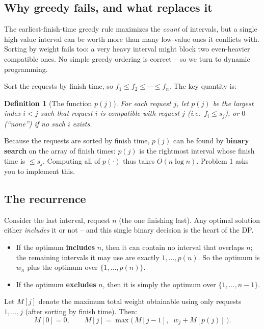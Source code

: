 \documentclass[11pt]{article}
\newtheorem{definition}[theorem]{Definition}
\begin{document}
\subsection{Why greedy fails, and what replaces it}

The earliest-finish-time greedy rule maximizes the \emph{count} of intervals, but a single
high-value interval can be worth more than many low-value ones it conflicts with. Sorting
by weight fails too: a very heavy interval might block two even-heavier compatible ones. No
simple greedy ordering is correct -- so we turn to dynamic programming.

Sort the requests by finish time, so $f_1 \le f_2 \le \cdots \le f_n$. The key quantity is:

\begin{definition}[The function $p(j)$]
For each request $j$, let $p(j)$ be the largest index $i < j$ such that request $i$ is
compatible with request $j$ (i.e.\ $f_i \le s_j$), or $0$ (``none'') if no such $i$
exists.
\end{definition}

Because the requests are sorted by finish time, $p(j)$ can be found by \textbf{binary
search} on the array of finish times: $p(j)$ is the rightmost interval whose finish time is
$\le s_j$. Computing all of $p(\cdot)$ thus takes $O(n \log n)$. Problem 1 asks you to
implement this.

\subsection{The recurrence}

Consider the last interval, request $n$ (the one finishing last). Any optimal solution
either \emph{includes} it or not -- and this single binary decision is the heart of the
DP.

\begin{itemize}
    \item If the optimum \textbf{includes} $n$, then it can contain no interval that
    overlaps $n$; the remaining intervals it may use are exactly $1, \ldots, p(n)$. So the
    optimum is $w_n$ plus the optimum over $\{1, \ldots, p(n)\}$.
    \item If the optimum \textbf{excludes} $n$, then it is simply the optimum over
    $\{1, \ldots, n-1\}$.
\end{itemize}

Let $M[j]$ denote the maximum total weight obtainable using only requests $1, \ldots, j$
(after sorting by finish time). Then:
\[
M[0] = 0, \qquad
M[j] = \max\bigl(\, M[j-1], \;\; w_j + M[p(j)] \,\bigr).
\]
\end{document}
